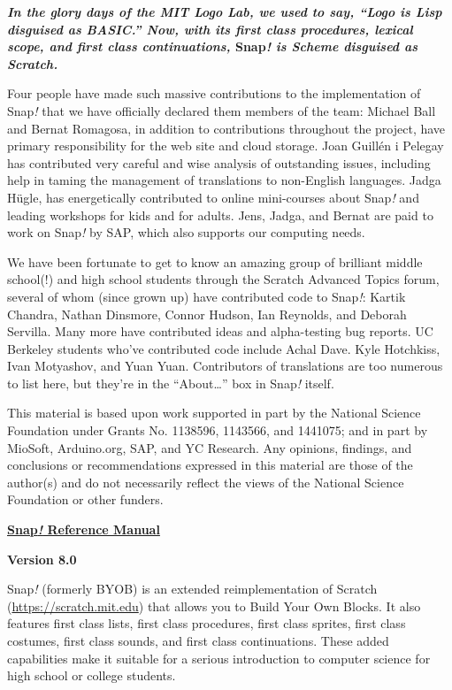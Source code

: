 \textbf{\emph{In the glory days of the MIT Logo Lab, we used to say,
``Logo is Lisp disguised as BASIC.'' Now, with its first class
procedures, lexical scope, and first class continuations,} Snap\emph{!
is Scheme disguised as Scratch.}}

Four people have made such massive contributions to the implementation
of Snap\emph{!} that we have officially declared them members of the
team: Michael Ball and Bernat Romagosa, in addition to contributions
throughout the project, have primary responsibility for the web site and
cloud storage. Joan Guillén i Pelegay has contributed very careful and
wise analysis of outstanding issues, including help in taming the
management of translations to non-English languages. Jadga Hügle, has
energetically contributed to online mini-courses about Snap\emph{!} and
leading workshops for kids and for adults. Jens, Jadga, and Bernat are
paid to work on Snap\emph{!} by SAP, which also supports our computing
needs.

We have been fortunate to get to know an amazing group of brilliant
middle school(!) and high school students through the Scratch Advanced
Topics forum, several of whom (since grown up) have contributed code to
Snap\emph{!}: Kartik Chandra, Nathan Dinsmore, Connor Hudson, Ian
Reynolds, and Deborah Servilla. Many more have contributed ideas and
alpha-testing bug reports. UC Berkeley students who've contributed code
include Achal Dave. Kyle Hotchkiss, Ivan Motyashov, and Yuan Yuan.
Contributors of translations are too numerous to list here, but they're
in the ``About\ldots'' box in Snap\emph{!} itself.

This material is based upon work supported in part by the National
Science Foundation under Grants No\textsc{.} 1138596, 1143566, and
1441075; and in part by MioSoft, Arduino.org, SAP, and YC Research. Any
opinions, findings, and conclusions or recommendations expressed in this
material are those of the author(s) and do not necessarily reflect the
views of the National Science Foundation or other funders.

\textsc{\hfill\break
}\textbf{\ul{Snap\emph{!} Reference Manual}}

\textbf{Version 8.0}

Snap\emph{!} (formerly BYOB) is an extended reimplementation of Scratch
(\ul{https://scratch.mit.edu}) that allows you to Build Your Own Blocks.
It also features ﬁrst class lists, ﬁrst class procedures, first class
sprites, first class costumes, first class sounds, and first class
continuations. These added capabilities make it suitable for a serious
introduction to computer science for high school or college students.

